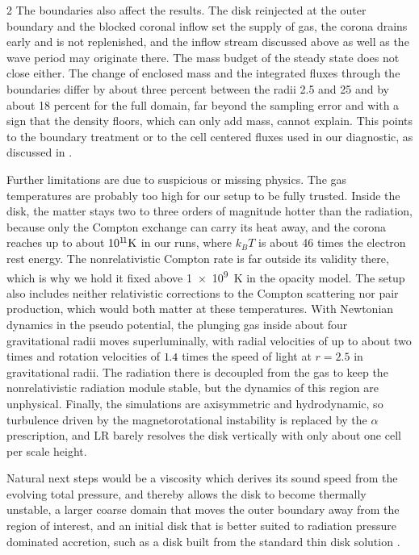 \begin{multicols}{2}
	The boundaries also affect the results. The disk reinjected at the outer boundary and the blocked coronal inflow set the
	supply of gas, the corona drains early and is not replenished, and the inflow stream discussed above as well as the wave period may
	originate there. The mass budget of the steady state does not close either. The change of enclosed mass and the integrated
	fluxes through the boundaries differ by about three percent between the radii \num{2.5} and \num{25} and by about \num{18}
	percent for the full domain, far beyond the sampling error and with a sign that the density floors, which can only add mass,
	cannot explain. This points to the boundary treatment or to the cell centered fluxes used in our diagnostic, as discussed in
	.

	Further limitations are due to suspicious or missing physics. The gas temperatures are probably too high for our setup to be fully trusted.
	Inside the disk, the matter stays two to three orders of magnitude hotter than the radiation, because only the Compton exchange can carry
	its heat away, and the corona reaches up to about ${\kern-0.5pt}10^{1{\kern-1pt}1}\unit{\kelvin}$ in our runs, where $k_B T$ is about
	\num{46} times the electron rest energy. The nonrelativistic Compton rate is far outside its validity there, which is why we hold it
	fixed above \qty{1e9}{\kelvin} in the opacity model. The setup also includes neither relativistic corrections to the Compton scattering
	nor pair production, which would both matter at these temperatures. With Newtonian dynamics in the pseudo potential, the plunging
	gas inside about four gravitational radii moves superluminally, with radial velocities of up to about two times and rotation
	velocities of ${\kern-0.5pt}1{\kern-0.5pt}.4$ times the speed of light at $r = 2.5$ in gravitational radii. The radiation
	there is decoupled from the gas to keep the nonrelativistic radiation module stable, but the dynamics of this region are
	unphysical. Finally, the simulations are axisymmetric and hydrodynamic, so turbulence driven by the magnetorotational
	instability is replaced by the $\alpha$ prescription, and LR barely resolves the disk vertically with only about one cell per scale
	height.

	Natural next steps would be a viscosity which derives its sound speed from the evolving total pressure, and thereby allows the disk to
	become thermally unstable, a larger coarse domain that moves the outer boundary away from the region of interest, and an initial disk
	that is better suited to radiation pressure dominated accretion, such as a disk built from the standard thin disk solution
	\cite{shak1973}.


\end{multicols}
